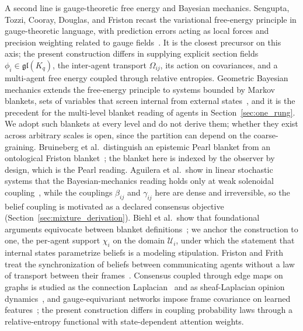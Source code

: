 \documentclass[11pt]{article}
\begin{document}
A second line is gauge-theoretic free energy and Bayesian mechanics. Sengupta, Tozzi, Cooray, Douglas, and Friston recast the variational free-energy principle in gauge-theoretic language, with prediction errors acting as local forces and precision weighting related to gauge fields~\cite{Sengupta2016NeuronalGauge}. It is the closest precursor on this axis; the present construction differs in supplying explicit section fields $\phi_i \in \mathfrak{gl}(K_q)$, the inter-agent transport $\Omega_{ij}$, its action on covariances, and a multi-agent free energy coupled through relative entropies. Geometric Bayesian mechanics extends the free-energy principle to systems bounded by Markov blankets, sets of variables that screen internal from external states~\cite{friston2019particular, dacosta2021bayesian, ramstead2023bayesian, Sakthivadivel2022, KirchhoffParrPalaciosFristonKiverstein2018}, and it is the precedent for the multi-level blanket reading of agents in Section~\ref{sec:one_rung}. We adopt such blankets at every level and do not derive them; whether they exist across arbitrary scales is open, since the partition can depend on the coarse-graining. Bruineberg et al.\ distinguish an epistemic Pearl blanket from an ontological Friston blanket~\cite{bruineberg2022emperor}; the blanket here is indexed by the observer by design, which is the Pearl reading. Aguilera et al.\ show in linear stochastic systems that the Bayesian-mechanics reading holds only at weak solenoidal coupling~\cite{aguilera2022particular}, while the couplings $\beta_{ij}$ and $\gamma_{ij}$ here are dense and irreversible, so the belief coupling is motivated as a declared consensus objective (Section~\ref{sec:mixture_derivation}). Biehl et al.\ show that foundational arguments equivocate between blanket definitions~\cite{biehl2021technical}; we anchor the construction to one, the per-agent support $\chi_i$ on the domain $\mathcal{U}_i$, under which the statement that internal states parametrize beliefs is a modeling stipulation. Friston and Frith treat the synchronization of beliefs between communicating agents without a law of transport between their frames~\cite{FristonFrith2015duet}. Consensus coupled through edge maps on graphs is studied as the connection Laplacian~\cite{SingerWu2012} and as sheaf-Laplacian opinion dynamics~\cite{HansenGhrist2021Discourse}, and gauge-equivariant networks impose frame covariance on learned features~\cite{cohen2019gauge}; the present construction differs in coupling probability laws through a relative-entropy functional with state-dependent attention weights.
\end{document}
